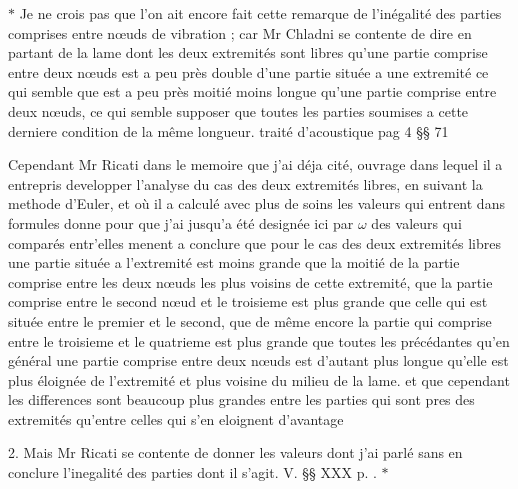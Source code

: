 \documentclass[11pt,a4paper]{article}
\begin{document}
$*$ Je ne crois pas que l'on ait encore fait cette remarque de l'inégalité
 des parties comprises entre  nœuds de vibration ;
car Mr Chladni se contente de dire  en partant de la lame dont
les deux extremités sont libres qu'une partie comprise entre deux nœuds est a
peu près double d'une partie située a une extremité ce qui semble
 que est a peu près moitié moins longue qu'une partie
comprise entre deux nœuds, ce qui semble supposer que toutes les parties
soumises a cette derniere condition  de la même longueur.
 traité d'acoustique pag 4 §§ 71

Cependant Mr Ricati dans le memoire que j'ai déja cité, ouvrage dans lequel
il a entrepris developper l'analyse du cas des deux extremités libres, en
suivant la methode d'Euler, et où il a calculé avec plus de soins les valeurs
qui entrent dans  formules donne pour  que
j'ai jusqu'a été designée ici par $\omega$ des valeurs qui comparés
entr'elles menent a conclure que pour le cas des deux extremités libres une
partie située a l'extremité est moins grande que la moitié de la partie
comprise entre les deux nœuds  les plus voisins de cette
extremité, que la partie comprise entre le second nœud et le troisieme est
plus grande que celle qui est située entre le premier et le second, que de
même encore la partie qui  comprise entre le troisieme
et le quatrieme est plus grande que toutes les précédantes 
qu'en général une partie comprise entre deux nœuds est d'autant plus longue
qu'elle est plus éloignée de l'extremité et plus voisine du milieu de la
lame. et que cependant les differences sont beaucoup plus grandes entre les
parties qui sont pres des extremités qu'entre celles qui s'en eloignent
d'avantage

2. Mais Mr Ricati se contente de donner les valeurs dont j'ai parlé sans en
conclure l'inegalité des parties dont il s'agit. V. §§ XXX p.
. $*$
\end{document}
